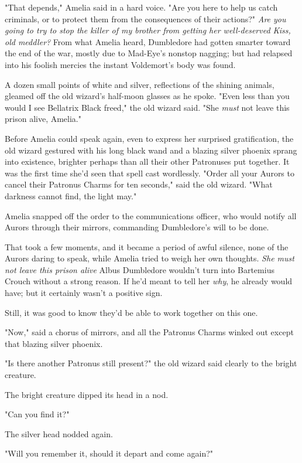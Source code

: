 "That depends," Amelia said in a hard voice. "Are you here to help us catch
criminals, or to protect them from the consequences of their actions?"
\emph{Are you going to try to stop the killer of my brother from getting her
well-deserved Kiss, old meddler?} From what Amelia heard, Dumbledore had gotten
smarter toward the end of the war, mostly due to Mad-Eye's nonstop nagging; but
had relapsed into his foolish mercies the instant Voldemort's body was found.

A dozen small points of white and silver, reflections of the shining animals,
gleamed off the old wizard's half-moon glasses as he spoke. "Even less than you
would I see Bellatrix Black freed," the old wizard said. "She \emph{must} not
leave this prison alive, Amelia."

Before Amelia could speak again, even to express her surprised gratification,
the old wizard gestured with his long black wand and a blazing silver phoenix
sprang into existence, brighter perhaps than all their other Patronuses put
together. It was the first time she'd seen that spell cast wordlessly. "Order
all your Aurors to cancel their Patronus Charms for ten seconds," said the old
wizard. "What darkness cannot find, the light may."

Amelia snapped off the order to the communications officer, who would notify
all Aurors through their mirrors, commanding Dumbledore's will to be done.

That took a few moments, and it became a period of awful silence, none of the
Aurors daring to speak, while Amelia tried to weigh her own thoughts. \emph{She
must not leave this prison alive{\el}} Albus Dumbledore wouldn't turn into
Bartemius Crouch without a strong reason. If he'd meant to tell her \emph{why},
he already would have; but it certainly wasn't a positive sign.

Still, it was good to know they'd be able to work together on this one.

"Now," said a chorus of mirrors, and all the Patronus Charms winked out except
that blazing silver phoenix.

"Is there another Patronus still present?" the old wizard said clearly to the
bright creature.

The bright creature dipped its head in a nod.

"Can you find it?"

The silver head nodded again.

"Will you remember it, should it depart and come again?"

